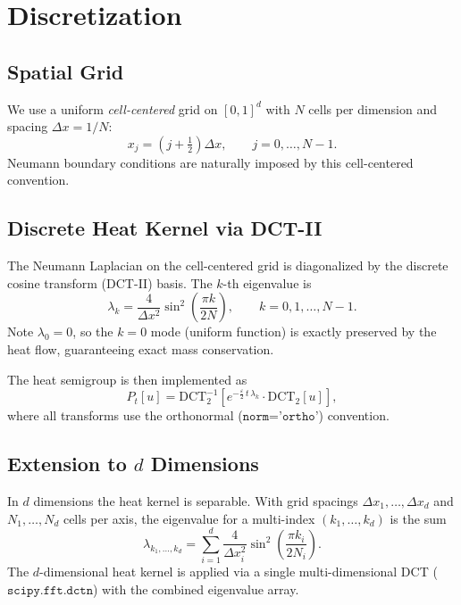 \documentclass[11pt,a4paper]{article}
\newcommand{\eps}{\varepsilon}
\newcommand{\Pt}[1]{P_{#1}}   %
\begin{document}
\section{Discretization}

\subsection{Spatial Grid}

We use a uniform \emph{cell-centered} grid on $[0,1]^d$ with $N$ cells per
dimension and spacing $\Delta x = 1/N$:
\begin{equation}
  x_j = \left(j + \tfrac{1}{2}\right)\Delta x, \qquad j = 0,\ldots,N-1.
\end{equation}
Neumann boundary conditions are naturally imposed by this cell-centered
convention.

\subsection{Discrete Heat Kernel via DCT-II}

The Neumann Laplacian on the cell-centered grid is diagonalized by the
discrete cosine transform (DCT-II) basis.  The $k$-th eigenvalue is
\begin{equation}\label{eq:eigenvalue}
  \lambda_k = \frac{4}{\Delta x^2}\sin^2\!\left(\frac{\pi k}{2N}\right),
  \qquad k = 0, 1, \ldots, N-1.
\end{equation}
Note $\lambda_0 = 0$, so the $k=0$ mode (uniform function) is exactly
preserved by the heat flow, guaranteeing exact mass conservation.

The heat semigroup is then implemented as
\begin{equation}
  \Pt{t}[u] = \mathrm{DCT}^{-1}_2\!\left[
    e^{-\frac\eps 2\,t\,\lambda_k}
    \cdot \mathrm{DCT}_2[u]
  \right],
\end{equation}
where all transforms use the orthonormal ($\texttt{norm='ortho'}$) convention.

\subsection{Extension to $d$ Dimensions}

In $d$ dimensions the heat kernel is separable.  With grid spacings
$\Delta x_1,\ldots,\Delta x_d$ and $N_1,\ldots,N_d$ cells per axis,
the eigenvalue for a multi-index $(k_1,\ldots,k_d)$ is the sum
\begin{equation}
  \lambda_{k_1,\ldots,k_d}
    = \sum_{i=1}^d \frac{4}{\Delta x_i^2}
      \sin^2\!\!\left(\frac{\pi k_i}{2N_i}\right).
\end{equation}
The $d$-dimensional heat kernel is applied via a single multi-dimensional
DCT ($\texttt{scipy.fft.dctn}$) with the combined eigenvalue array.
\end{document}
